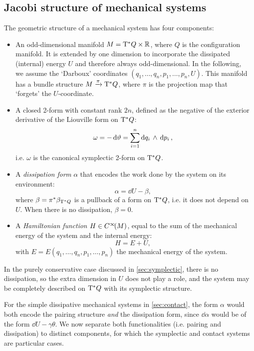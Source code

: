 \subsection{Jacobi structure of mechanical systems}
The geometric structure of a mechanical system has four components:
\begin{itemize}
    \item An odd-dimensional manifold $M = \mathrm{T}^*Q\times \mathbb{R}$, where $Q$ is the configuration manifold. It is extended by one dimension to incorporate the dissipated (internal) energy $U$ and therefore always odd-dimensional. In the following, we assume the `Darboux' coordinates $(q_1, \ldots, q_n, p_1, \ldots, p_n, U)$.
    This manifold has a bundle structure $M\xrightarrow[]{\pi}\mathrm{T}^*Q$, where $\pi$ is the projection map that `forgets' the $U$-coordinate.
    \item A closed 2-form with constant rank $2n$, defined as the negative of the exterior derivative of the Liouville form on $\mathrm{T}^*Q$:
        $$ \omega = -\dd{\vartheta} = \sum^n_{i=1}  \dd{q_i}\,\wedge\,\dd{p_i} , $$
        i.e. $\omega$ is the canonical symplectic 2-form on $\mathrm{T}^*Q$.
    \item A \emph{dissipation form} $\alpha$ that encodes the work done by the system on its environment:
        $$ \alpha = \dd{U} - \beta, $$
        where $\beta = \pi^*\beta_{\mathrm{T}^*Q}$ is a pullback of a form on $\mathrm{T}^*Q$, i.e. it does not depend on $U$. When there is no dissipation, $\beta = 0$.
    \item A \emph{Hamiltonian function} $H \in C^\infty\!\qty(M)$, equal to the sum of the mechanical energy of the system and the internal energy:
        $$ H = E + U, $$
        with $E = E(q_1, \ldots, q_n, p_1, \ldots, p_n)$ the mechanical energy of the system.
\end{itemize}

In the purely conservative case discussed in \cref{sec:symplectic}, there is no dissipation, so the extra dimension in $U$ does not play a role, and the system may be completely described on $\mathrm{T}^*Q$ with its symplectic structure. 

For the simple dissipative mechanical systems in \cref{sec:contact}, the form $\alpha$ would both encode the pairing structure \emph{and} the dissipation form, since $\dd{\alpha}$ would be of the form $\dd{U} - \gamma \theta$.  We now separate both functionalities (i.e. pairing and dissipation) to distinct components, for which the symplectic and contact systems are particular cases.

